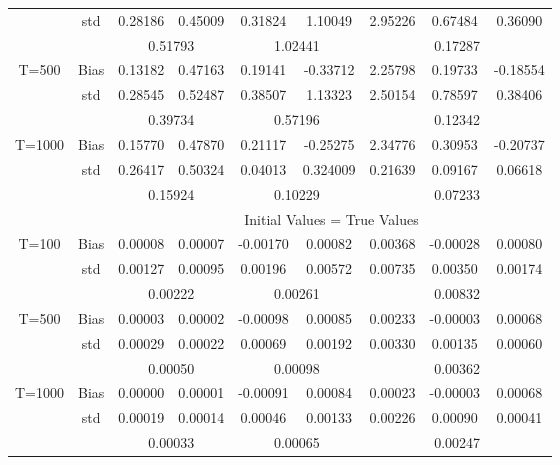 \documentclass[a4paper,12pt,times,numbered,print,index]{report}
\numberwithin{equation}{section}
\begin{document}
\begin{table}[htbp]
\begin{adjustbox}{max width=0.8\textwidth}
\begin{tabular}{ccccccccc}
		& std   & 0.28186 & 0.45009 & 0.31824 & 1.10049 & 2.95226 & 0.67484 & 0.36090 \\
		&       & \multicolumn{2}{c}{0.51793} & \multicolumn{2}{c}{1.02441} & \multicolumn{3}{c}{0.17287} \\
		\multirow{3}[0]{*}{T=500} & Bias  & 0.13182 & 0.47163 & 0.19141 & -0.33712 & 2.25798 & 0.19733 & -0.18554 \\
		& std   & 0.28545 & 0.52487 & 0.38507 & 1.13323 & 2.50154 & 0.78597 & 0.38406 \\
		&       & \multicolumn{2}{c}{0.39734} & \multicolumn{2}{c}{0.57196} & \multicolumn{3}{c}{0.12342} \\
		\multirow{3}[1]{*}{T=1000} & Bias  & 0.15770 & 0.47870 & 0.21117 & -0.25275 & 2.34776 & 0.30953 & -0.20737 \\
		& std   & 0.26417 & 0.50324 & 0.04013 & 0.324009 & 0.21639 & 0.09167 & 0.06618 \\
		&       & \multicolumn{2}{c}{0.15924} & \multicolumn{2}{c}{0.10229} & \multicolumn{3}{c}{0.07233} \\
		\midrule
		&       & \multicolumn{7}{c}{Initial Values = True Values} \\
		\midrule
		\multirow{3}[1]{*}{T=100} & Bias  & 0.00008 & 0.00007 & -0.00170 & 0.00082 & 0.00368 & -0.00028 & 0.00080 \\
		& std   & 0.00127 & 0.00095 & 0.00196 & 0.00572 & 0.00735 & 0.00350 & 0.00174 \\
		&       & \multicolumn{2}{c}{0.00222} & \multicolumn{2}{c}{0.00261} & \multicolumn{3}{c}{0.00832} \\
		\multirow{3}[0]{*}{T=500} & Bias  & 0.00003 & 0.00002 & -0.00098 & 0.00085 & 0.00233 & -0.00003 & 0.00068 \\
		& std   & 0.00029 & 0.00022 & 0.00069 & 0.00192 & 0.00330 & 0.00135 & 0.00060 \\
		&       & \multicolumn{2}{c}{0.00050} & \multicolumn{2}{c}{0.00098} & \multicolumn{3}{c}{0.00362} \\
		\multirow{3}[1]{*}{T=1000} & Bias  & 0.00000 & 0.00001 & -0.00091 & 0.00084 & 0.00023 & -0.00003 & 0.00068 \\
		& std   & 0.00019 & 0.00014 & 0.00046 & 0.00133 & 0.00226 & 0.00090 & 0.00041 \\
		&       & \multicolumn{2}{c}{0.00033} & \multicolumn{2}{c}{0.00065} & \multicolumn{3}{c}{0.00247} \\
		\bottomrule
		\bottomrule
    \end{tabular}%
	\end{adjustbox}
	\label{init values}%
\end{table}%
\end{document}
